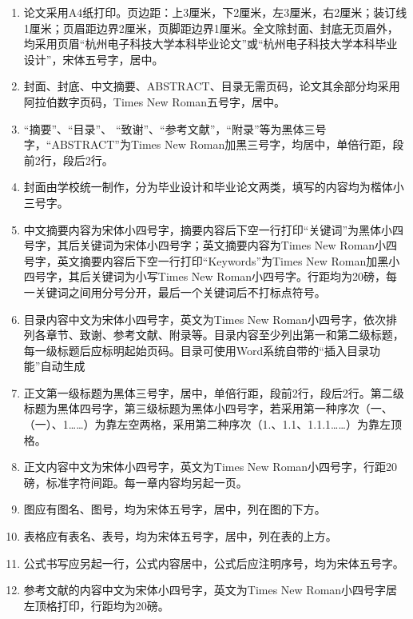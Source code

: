 \documentclass{HDU-Bachelor-Thesis}
\begin{document}
\begin{enumerate}
    \item 论文采用A4纸打印。页边距：上3厘米，下2厘米，左3厘米，右2厘米；装订线1厘米；页眉距边界2厘米，页脚距边界1厘米。全文除封面、封底无页眉外，均采用页眉“杭州电子科技大学本科毕业论文”或“杭州电子科技大学本科毕业设计”，宋体五号字，居中。

    \item 封面、封底、中文摘要、ABSTRACT、目录无需页码，论文其余部分均采用阿拉伯数字页码，Times New Roman五号字，居中。

    \item “摘要”、“目录”、 “致谢”、“参考文献”，“附录”等为黑体三号字，“ABSTRACT”为Times New Roman加黑三号字，均居中，单倍行距，段前2行，段后2行。

    \item 封面由学校统一制作，分为毕业设计和毕业论文两类，填写的内容均为楷体小三号字。

    \item 中文摘要内容为宋体小四号字，摘要内容后下空一行打印“关键词”为黑体小四号字，其后关键词为宋体小四号字；英文摘要内容为Times New Roman小四号字，英文摘要内容后下空一行打印“Keywords”为Times New Roman加黑小四号字，其后关键词为小写Times New Roman小四号字。行距均为20磅，每一关键词之间用分号分开，最后一个关键词后不打标点符号。

    \item 目录内容中文为宋体小四号字，英文为Times New Roman小四号字，依次排列各章节、致谢、参考文献、附录等。目录内容至少列出第一和第二级标题，每一级标题后应标明起始页码。目录可使用Word系统自带的“插入目录功能”自动生成

    \item 正文第一级标题为黑体三号字，居中，单倍行距，段前2行，段后2行。第二级标题为黑体四号字，第三级标题为黑体小四号字，若采用第一种序次（一、（一）、1……）为靠左空两格，采用第二种序次（1.、1.1、1.1.1……）为靠左顶格。

    \item 正文内容中文为宋体小四号字，英文为Times New Roman小四号字，行距20磅，标准字符间距。每一章内容均另起一页。

    \item  图应有图名、图号，均为宋体五号字，居中，列在图的下方。

    \item 表格应有表名、表号，均为宋体五号字，居中，列在表的上方。

    \item 公式书写应另起一行，公式内容居中，公式后应注明序号，均为宋体五号字。

    \item 参考文献的内容中文为宋体小四号字，英文为Times New Roman小四号字居左顶格打印，行距均为20磅。
\end{enumerate}
\end{document}
